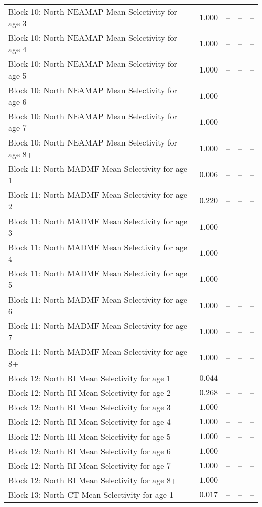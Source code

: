 \documentclass[
]{article}
\begin{document}
\begin{landscape}
\begin{longtable}[t]{lrrrr}
Block 10: North NEAMAP Mean Selectivity for age 3 & $1.000$ & -- & -- & --\\
Block 10: North NEAMAP Mean Selectivity for age 4 & $1.000$ & -- & -- & --\\
Block 10: North NEAMAP Mean Selectivity for age 5 & $1.000$ & -- & -- & --\\
Block 10: North NEAMAP Mean Selectivity for age 6 & $1.000$ & -- & -- & --\\
\addlinespace
Block 10: North NEAMAP Mean Selectivity for age 7 & $1.000$ & -- & -- & --\\
Block 10: North NEAMAP Mean Selectivity for age 8+ & $1.000$ & -- & -- & --\\
Block 11: North MADMF Mean Selectivity for age 1 & $0.006$ & -- & -- & --\\
Block 11: North MADMF Mean Selectivity for age 2 & $0.220$ & -- & -- & --\\
Block 11: North MADMF Mean Selectivity for age 3 & $1.000$ & -- & -- & --\\
\addlinespace
Block 11: North MADMF Mean Selectivity for age 4 & $1.000$ & -- & -- & --\\
Block 11: North MADMF Mean Selectivity for age 5 & $1.000$ & -- & -- & --\\
Block 11: North MADMF Mean Selectivity for age 6 & $1.000$ & -- & -- & --\\
Block 11: North MADMF Mean Selectivity for age 7 & $1.000$ & -- & -- & --\\
Block 11: North MADMF Mean Selectivity for age 8+ & $1.000$ & -- & -- & --\\
\addlinespace
Block 12: North RI Mean Selectivity for age 1 & $0.044$ & -- & -- & --\\
Block 12: North RI Mean Selectivity for age 2 & $0.268$ & -- & -- & --\\
Block 12: North RI Mean Selectivity for age 3 & $1.000$ & -- & -- & --\\
Block 12: North RI Mean Selectivity for age 4 & $1.000$ & -- & -- & --\\
Block 12: North RI Mean Selectivity for age 5 & $1.000$ & -- & -- & --\\
\addlinespace
Block 12: North RI Mean Selectivity for age 6 & $1.000$ & -- & -- & --\\
Block 12: North RI Mean Selectivity for age 7 & $1.000$ & -- & -- & --\\
Block 12: North RI Mean Selectivity for age 8+ & $1.000$ & -- & -- & --\\
Block 13: North CT Mean Selectivity for age 1 & $0.017$ & -- & -- & --\\

\end{longtable}
\end{landscape}
\end{document}
